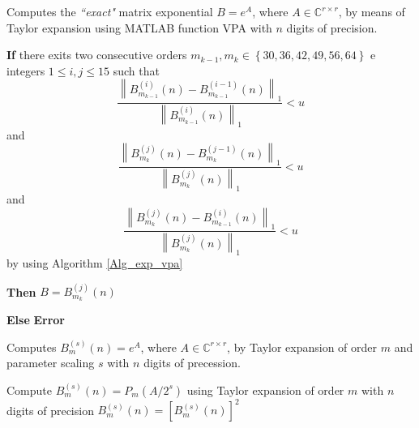 \begin{algorithm}[H]
\caption{Computes the {\it``exact"} matrix exponential $B=e^{A}$,
where $A \in {\mathbb{C}^{r \times r}}$, by means of Taylor expansion using MATLAB function VPA with $n$ digits of precision.}
\label{Alg_exp_exact}
\begin{algorithmic} [1]
\State \textbf{If} there exits two consecutive orders $m_{k-1},m_{k}\in \left\{ {30,36,42,49,56,64} \right\}$ e integers $1 \le i,j \le 15$ such that
 \[\frac{{{{\left\| {B_{{m_{k - 1}}}^{(i)}(n) - B_{{m_{k - 1}}}^{(i - 1)}(n)} \right\|}_1}}}{{{{\left\| {B_{{m_{k - 1}}}^{(i)}(n)} \right\|}_1}}} < u\] and
\[\frac{{{{\left\| {B_{{m_k}}^{(j)}(n) - B_{{m_k}}^{(j - 1)}(n)} \right\|}_1}}}{{{{\left\| {B_{{m_k}}^{(j)}(n)} \right\|}_1}}} < u\]
and
\[\frac{{{{\left\| {B_{{m_k}}^{(j)}(n) - B_{{m_{k - 1}}}^{(i)}(n)} \right\|}_1}}}{{{{\left\| {B_{{m_k}}^{(j)}(n)} \right\|}_1}}} < u\]
by using Algorithm \ref{Alg_exp_vpa}

\textbf{Then}
\Return $B={B_{{m_k}}^{(j)}(n)}$

\textbf{Else}  \Return \textbf{Error} 
\end{algorithmic}
\end{algorithm}

\begin{algorithm}[H]
\caption{Computes $B^{(s)}_{m}(n)=e^{A}$,
where $A \in {\mathbb{C}^{r \times r}}$, by Taylor expansion of order $m$ and parameter scaling $s$ with $n$ digits of precession.}
\label{Alg_exp_vpa}
\begin{algorithmic} [1]

\State Compute $B^{(s)}_{m}(n) = {P_{m}}(A/2^{s})$ using Taylor
expansion of order $m$ with $n$ digits of precision
    \State $B^{(s)}_{m}(n)=[B^{(s)}_{m}(n)]^{2}$
 \EndFor
\end{algorithmic}
\end{algorithm}
